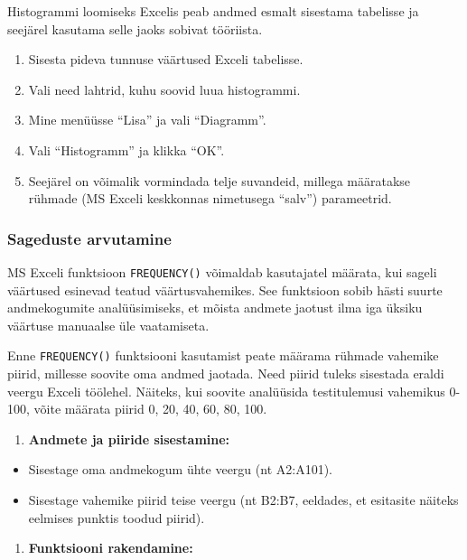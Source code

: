 \documentclass[
]{book}
\providecommand{\tightlist}{%
  \setlength{\itemsep}{0pt}\setlength{\parskip}{0pt}}
\begin{document}
Histogrammi loomiseks Excelis peab andmed esmalt sisestama tabelisse ja seejärel kasutama selle jaoks sobivat tööriista.

\begin{enumerate}
\def\labelenumi{\arabic{enumi}.}
\tightlist
\item
  Sisesta pideva tunnuse väärtused Exceli tabelisse.
\item
  Vali need lahtrid, kuhu soovid luua histogrammi.
\item
  Mine menüüsse ``Lisa'' ja vali ``Diagramm''.
\item
  Vali ``Histogramm'' ja klikka ``OK''.
\item
  Seejärel on võimalik vormindada telje suvandeid, millega määratakse rühmade (MS Exceli keskkonnas nimetusega ``salv'') parameetrid.
\end{enumerate}

\subsubsection{Sageduste arvutamine}\label{sageduste-arvutamine-1}

MS Exceli funktsioon \texttt{FREQUENCY()} võimaldab kasutajatel määrata, kui sageli väärtused esinevad teatud väärtusvahemikes. See funktsioon sobib hästi suurte andmekogumite analüüsimiseks, et mõista andmete jaotust ilma iga üksiku väärtuse manuaalse üle vaatamiseta.

Enne \texttt{FREQUENCY()} funktsiooni kasutamist peate määrama rühmade vahemike piirid, millesse soovite oma andmed jaotada. Need piirid tuleks sisestada eraldi veergu Exceli töölehel. Näiteks, kui soovite analüüsida testitulemusi vahemikus 0-100, võite määrata piirid 0, 20, 40, 60, 80, 100.

\begin{enumerate}
\def\labelenumi{\arabic{enumi}.}
\tightlist
\item
  \textbf{Andmete ja piiride sisestamine:}
\end{enumerate}

\begin{itemize}
\tightlist
\item
  Sisestage oma andmekogum ühte veergu (nt A2:A101).
\item
  Sisestage vahemike piirid teise veergu (nt B2:B7, eeldades, et esitasite näiteks eelmises punktis toodud piirid).
\end{itemize}

\begin{enumerate}
\def\labelenumi{\arabic{enumi}.}
\setcounter{enumi}{1}
\tightlist
\item
  \textbf{Funktsiooni rakendamine:}
\end{enumerate}
\end{document}
